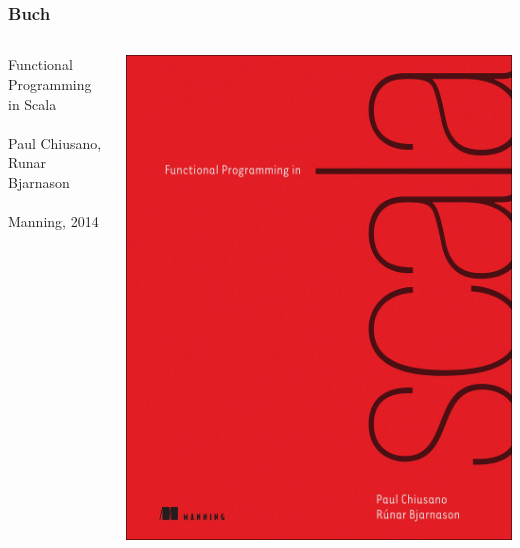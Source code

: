 	\section*{}
		\begin{frame}[fragile]
		\frametitle{Buch}
	    
\begin{columns}[c]
  \begin{column}{0.55\textwidth}
    Functional Programming in Scala\\
    \leavevmode \\
    Paul Chiusano,
    Runar Bjarnason\\
    \leavevmode \\
    Manning, 2014
  \end{column}
  \begin{column}[T]{0.55\textwidth}
    \includegraphics[scale=0.06]{book2.jpg}
  \end{column}
\end{columns}
		
		
\end{frame}